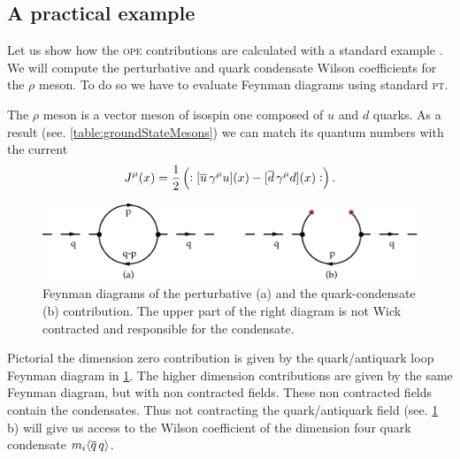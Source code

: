 \documentclass[../../index.tex]{subfiles}
\begin{document}
\subsection{A practical example}
Let us show how the \textsc{ope} contributions are calculated with a standard
example \cite{Shifman1978, Pascual1984}. We will compute the perturbative and
quark condensate Wilson coefficients for the \(\rho\) meson. To do so we have to
evaluate Feynman diagrams using standard \textsc{pt}.

The \(\rho\) meson is a vector meson of isospin one composed of \(u\) and \(d\)
quarks. As a result (see. \cref{table:groundStateMesons}) we can match its
quantum numbers with the current
\begin{equation}
  J^\mu(x) = \frac{1}{2}\left(:[\overline{u}\, \gamma^\mu u](x) - [\overline{d}\, \gamma^\mu d](x):\right).
\end{equation}
\begin{figure}
  \centering
  \includegraphics[width=\textwidth]{./images/condensateFeynmanDiagram.eps}
  \caption{Feynman diagrams of the perturbative (a) and the quark-condensate (b)
    contribution. The upper part of the right diagram is not Wick contracted and
    responsible for the condensate.}
  \label{fig:OPEFeynmanDiagram}
\end{figure}
Pictorial the dimension zero contribution is given by the quark\-/antiquark loop
Feynman diagram in \cref{fig:OPEFeynmanDiagram}. The higher dimension contributions
are given by the same Feynman diagram, but with non contracted fields. These non
contracted fields contain the condensates. Thus not contracting the
quark\-/antiquark field (see. \cref{fig:OPEFeynmanDiagram} b) will give us
access to the Wilson coefficient of the dimension four quark condensate \(m_i
\langle \overline{q}\,q \rangle\).
\end{document}
